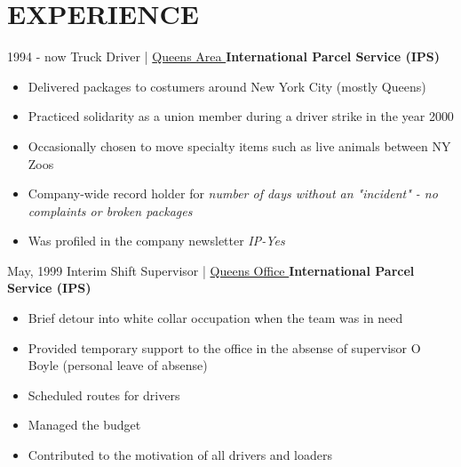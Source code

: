 \documentclass{article}
\begin{document}
\section{EXPERIENCE}
\begin{entrylist}

  \entry
    {1994 - now\enspace}
    {Truck Driver | }{ \href{https://kingofqueens.fandom.com/de/wiki/International_Parcel_Service}{\small Queens Area \faMousePointer}}
    {\normalsize\textbf{\color{ipsgreen}\faMapMarker\space International Parcel Service (IPS)}}
    {\jobspace
    \begin{itemize}[leftmargin=*, itemsep = 0.1em]
    \item Delivered packages to costumers around New York City (mostly Queens)
    \item Practiced solidarity as a union member during a driver strike in the year 2000
    \item Occasionally chosen to move specialty items such as live animals between NY Zoos
    \item Company-wide record holder for \textit{number of days without an "incident" - no complaints or broken packages}
    \item Was profiled in the company newsletter \textit{IP-Yes}\\
    \end{itemize}
    }
    
  \entry
    {May, 1999\enspace}
    {Interim Shift Supervisor | }{ \href{https://kingofqueens.fandom.com/de/wiki/International_Parcel_Service}{\small Queens Office \faMousePointer}}
    {\normalsize\textbf{\color{ipsgreen}\faMapMarker\space International Parcel Service (IPS)}}
    {\jobspace
    \begin{itemize}[leftmargin=*, itemsep = 0.1em]
    \item Brief detour into white collar occupation when the team was in need
    \item Provided temporary support to the office in the absense of supervisor O Boyle (personal leave of absense)
    \item Scheduled routes for drivers
    \item Managed the budget
    \item Contributed to the motivation of all drivers and loaders\\
    \end{itemize}
    }
    

\end{entrylist}
\end{document}
